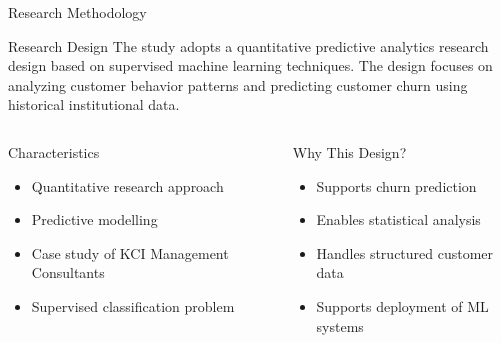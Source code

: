 \documentclass[10pt]{beamer}
\begin{document}
	
	\begin{frame}{Research Methodology}
		
		\small
		
		\begin{block}{Research Design}
			The study adopts a quantitative predictive analytics research design based on supervised machine learning techniques. The design focuses on analyzing customer behavior patterns and predicting customer churn using historical institutional data.
		\end{block}
		
		\vspace{0.3cm}
		
		\begin{columns}
			
			
			\begin{exampleblock}{Characteristics}
				\begin{itemize}
					\item Quantitative research approach
					
					\item Predictive modelling 
					
					\item Case study of KCI Management Consultants
					
					\item Supervised classification problem
				\end{itemize}
			\end{exampleblock}
			
			
			\begin{exampleblock}{Why This Design?}
				\begin{itemize}
					\item Supports churn prediction
					
					\item Enables statistical analysis
					
					\item Handles structured customer data
					
					\item Supports deployment of ML systems
				\end{itemize}
			\end{exampleblock}
			
		\end{columns}
		
	\end{frame}
	
\end{document}
